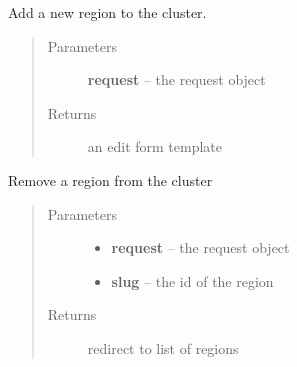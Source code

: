 \documentclass[letterpaper,10pt,english]{sphinxmanual}
\begin{document}
\begin{fulllineitems}
\label{api/cluster:limeade.cluster.views.region_add}
Add a new region to the cluster.
\begin{quote}\begin{description}
\item[{Parameters}] \leavevmode
\textbf{request} -- the request object

\item[{Returns}] \leavevmode
an edit form template

\end{description}\end{quote}

\end{fulllineitems}


\begin{fulllineitems}
\label{api/cluster:limeade.cluster.views.region_delete}
Remove a region from the cluster
\begin{quote}\begin{description}
\item[{Parameters}] \leavevmode\begin{itemize}
\item {} 
\textbf{request} -- the request object

\item {} 
\textbf{slug} -- the id of the region

\end{itemize}

\item[{Returns}] \leavevmode
redirect to list of regions

\end{description}\end{quote}

\end{fulllineitems}

\end{document}

